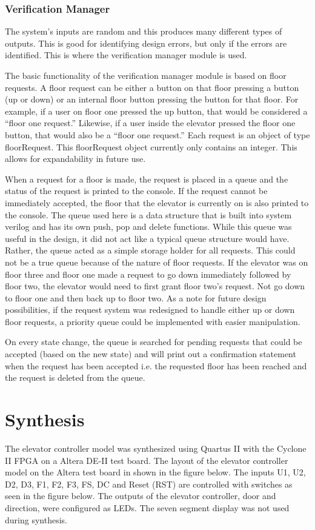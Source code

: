\documentclass[journal]{IEEEtran}
\begin{document}
\subsubsection{Verification Manager}
The system’s inputs are random and this produces many different types of outputs. This is good for identifying design errors, but only if the errors are identified. This is where the verification manager module is used.

The basic functionality of the verification manager module is based on floor requests. A floor request can be either a button on that floor pressing a button (up or down) or an internal floor button pressing the button for that floor. For example, if a user on floor one pressed the up button, that would be considered a “floor one request.” Likewise, if a user inside the elevator pressed the floor one button, that would also be a “floor one request.” Each request is an object of type floorRequest. This floorRequest object currently only contains an integer. This allows for expandability in future use.

When a request for a floor is made, the request is placed in a queue and the status of the request is printed to the console. If the request cannot be immediately accepted, the floor that the elevator is currently on is also printed to the console. The queue used here is a data structure that is built into system verilog and has its own push, pop and delete functions. While this queue was useful in the design, it did not act like a typical queue structure would have. Rather, the queue acted as a simple storage holder for all requests. This could not be a true queue because of the nature of floor requests. If the elevator was on floor three and floor one made a request to go down immediately followed by floor two, the elevator would need to first grant floor two’s request. Not go down to floor one and then back up to floor two. As a note for future design possibilities, if the request system was redesigned to handle either up or down floor requests, a priority queue could be implemented with easier manipulation.

On every state change, the queue is searched for pending requests that could be accepted (based on the new state) and will print out a confirmation statement when the request has been accepted i.e. the requested floor has been reached and the request is deleted from the queue.

\section{Synthesis}
The elevator controller model was synthesized using Quartus II with the Cyclone II FPGA  on a Altera DE-II test board. The layout of the elevator controller model on the Altera test board in shown in the figure below. The inputs U1, U2, D2, D3, F1, F2, F3, FS, DC and Reset (RST) are controlled with switches as seen in the figure below. The outputs of the elevator controller, door and direction, were configured as LEDs. The seven segment display was not used during synthesis. 
\end{document}
